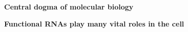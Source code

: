 \documentclass[landscape]{slides}
\begin{document}
\begin{slide}
\begin{center}
\textbf{Central dogma of molecular biology}
\end{center}
\medskip
\begin{slide}
\end{slide}
\begin{slide}
\end{slide}
\begin{slide}
\begin{center}
\textbf{Functional RNAs play many vital roles in the cell}
\end{center}
\medskip


\end{slide}
\end{slide}
\end{document}
